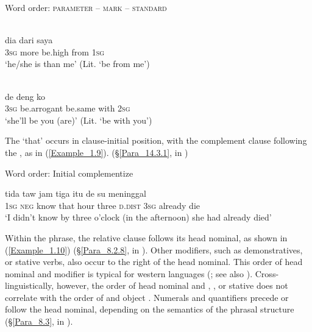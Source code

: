 \begin{styleExampleTitle}
{Word order: \textsc{parameter} – \textsc{mark} – \textsc{standard}}
\end{styleExampleTitle}
\ea
\label{Example_1.7}
 {} {} {} {}\\ %
 {dia}  {}  {}  {dari}  {saya}\\
 {\textsc{3sg}}  {more}  {be.high}  {from}  {\textsc{1sg}}\\
\glt 
‘he/she is  than me’ (Lit. ‘be  from me’) \textstyleExampleSource{[Elicited BR111011.002]}
\z

 
\ea
\label{Example_1.8}
 {} {} {} {}\\ %
 de      deng  ko\\
 \textsc{3sg}  be.arrogant  be.same  with  \textsc{2sg}\\
\glt 
‘she’ll be  you (are)’ (Lit. ‘be  with you’) \textstyleExampleSource{[081006-005-Cv.0002]}
\z


The   ‘that’ occurs in clause-initial position, with the complement clause following the , as in (\ref{Example_1.9}). (§\ref{Para_14.3.1}, in )

\begin{styleExampleTitle}
Word order: Initial complementize
\end{styleExampleTitle}

\ea
\label{Example_1.9}
 {tida} {taw} {} {jam} {tiga} {itu} {de} {su} {meninggal}\\ %
\textsc{1sg} \textsc{neg} know that hour three \textsc{d.dist} \textsc{3sg} already die\\

\glt 
‘I didn’t know  by three o’clock (in the afternoon) she had already died’ \textstyleExampleSource{[080917-001-CvNP.0005]}
\z


Within the  phrase, the relative clause follows its head nominal, as shown in (\ref{Example_1.10}) (§\ref{Para_8.2.8}, in ). Other modifiers, such as demonstratives, or  stative verbs, also occur to the right of the head nominal. This order of head nominal and modifier is typical for western  languages (\citealt[142]{Himmelmann.2005}; see also \citealt[359–373]{Donohue.2007c}). Cross-linguistically, however, the order of head nominal and , , or stative  does not correlate with the order of  and object \citep[130]{Dryer.2007}. Numerals and quantifiers precede or follow the head nominal, depending on the semantics of the phrasal structure (§\ref{Para_8.3}, in ).



